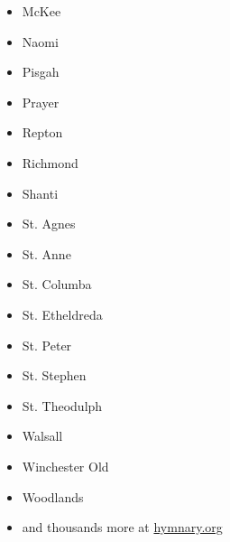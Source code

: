 \begin{itemize}
	\item McKee
	\item Naomi
	\item Pisgah
	\item Prayer
	\item Repton
	\item Richmond
	\item Shanti
	\item St. Agnes
	\item St. Anne
	\item St. Columba
	\item St. Etheldreda
	\item St. Peter
	\item St. Stephen
	\item St. Theodulph
	\item Walsall
	\item Winchester Old
	\item Woodlands
	\item \textup{and thousands more at \href{https://hymnary.org/search?page=3&qu=meter\%3A8.6.8.6\%20in\%3Atunes&sort=totalInstances}{hymnary.org}}
\end{itemize}

